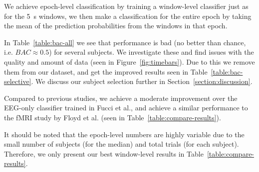         We achieve epoch-level classification by training a window-level classifier just as for the \SI{5}{\second} windows, we then make a classification for the entire epoch by taking the mean of the prediction probabilities from the windows in that epoch.

        

        In Table~\ref{table:bac-all} we see that performance is bad (no better than chance, i.e. $BAC \approx 0.5$) for several subjects. We investigate these and find issues with the quality and amount of data (seen in Figure~\ref{fig:timebars}). Due to this we remove them from our dataset, and get the improved results seen in Table~\ref{table:bac-selective}. We discuss our subject selection further in Section~\ref{section:discussion}.

        Compared to previous studies, we achieve a moderate improvement over the EEG-only classifier trained in Fucci et al., and achieve a similar performance to the fMRI study by Floyd et al. (seen in Table~\ref{table:compare-results}).

        

        It should be noted that the epoch-level numbers are highly variable due to the small number of subjects (for the median) and total trials (for each subject). Therefore, we only present our best window-level results in Table~\ref{table:compare-results}.

        

